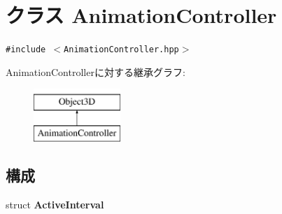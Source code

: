 \hypertarget{classm3g_1_1AnimationController}{
\section{クラス AnimationController}
\label{classm3g_1_1AnimationController}
}
{\tt \#include $<$AnimationController.hpp$>$}

AnimationControllerに対する継承グラフ:\begin{figure}[H]
\begin{center}
\leavevmode
\includegraphics[height=2cm]{classm3g_1_1AnimationController}
\end{center}
\end{figure}
\subsection*{構成}
\begin{CompactItemize}
\item 
struct \textbf{ActiveInterval}
\end{CompactItemize}
